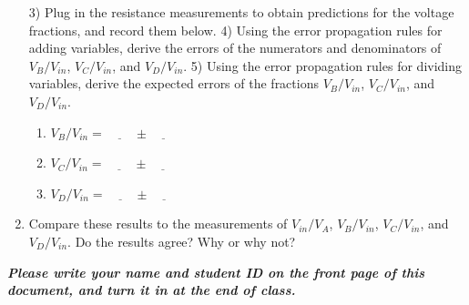 \documentclass[12pt]{article}
\begin{document}
\begin{enumerate}
3) Plug in the resistance measurements to obtain predictions for the voltage fractions, and record them below.  4) Using the error propagation rules for adding variables, derive the errors of the numerators and denominators of $V_B/V_{in}$, $V_C/V_{in}$, and $V_D/V_{in}$.  5) Using the error propagation rules for dividing variables, derive the expected errors of the fractions $V_B/V_{in}$, $V_C/V_{in}$, and $V_D/V_{in}$. \\ \vspace{4cm}
\begin{enumerate}
\item $V_B/V_{in}=\underline{~~~~~~~~~~}\pm\underline{~~~~~~~~~~}$
\item $V_C/V_{in}=\underline{~~~~~~~~~~}\pm\underline{~~~~~~~~~~}$
\item $V_D/V_{in}=\underline{~~~~~~~~~~}\pm\underline{~~~~~~~~~~}$
\end{enumerate}
\item Compare these results to the measurements of $V_{in}/V_A$, $V_B/V_{in}$, $V_C/V_{in}$, and $V_D/V_{in}$.  Do the results agree?  Why or why not? \\ \vspace{2cm}
\end{enumerate}
\textit{\textbf{Please write your name and student ID on the front page of this document, and turn it in at the end of class.}}
\end{document}
